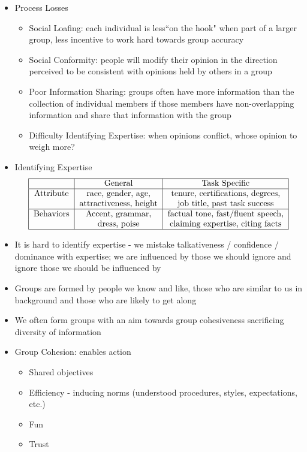 \documentclass[12pt]{article}
\begin{document}
\begin{itemize}
\item Process Losses \begin{itemize} 
\item Social Loafing: each individual is less``on the hook" when part of a larger group, less incentive to work hard towards group accuracy 
\item Social Conformity: people will modify their opinion in the direction perceived to be consistent with opinions held by others in a group 
\item Poor Information Sharing: groups often have more information than the collection of individual members if those members have non-overlapping information and share that information with the group 
\item Difficulty Identifying Expertise: when opinions conflict, whose opinion to weigh more? \end{itemize} 
\item Identifying Expertise $$ \begin{tabular}{|c|c|c|} \hline 
& General & Task Specific \\ \hline 
Attribute & race, gender, age, & tenure, certifications, degrees, \\ 
& attractiveness, height & job title, past task success \\ \hline 
Behaviors & Accent, grammar, &  factual tone, fast/fluent speech, \\ 
& dress, poise & claiming expertise, citing facts \\ \hline \end{tabular} $$ 
\item It is hard to identify expertise - we mistake talkativeness / confidence / dominance with expertise; we are influenced by those we should ignore and ignore those we should be influenced by 
\item Groups are formed by people we know and like, those who are similar to us in background and those who are likely to get along
\item We often form groups with an aim towards group cohesiveness sacrificing diversity of information 
\item Group Cohesion: enables action \begin{itemize} 
\item Shared objectives 
\item Efficiency - inducing norms (understood procedures, styles, expectations, etc.) 
\item Fun 
\item Trust \end{itemize} 

\end{itemize}
\end{document}

